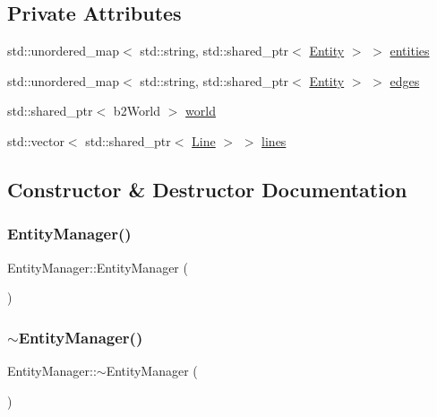 \subsection*{Private Attributes}
\begin{DoxyCompactItemize}
\item 
std\+::unordered\+\_\+map$<$ std\+::string, std\+::shared\+\_\+ptr$<$ \hyperlink{classEntity}{Entity} $>$ $>$ \hyperlink{classEntityManager_a9c442e6363c2269e9c95db90762367f3}{entities}
\item 
std\+::unordered\+\_\+map$<$ std\+::string, std\+::shared\+\_\+ptr$<$ \hyperlink{classEntity}{Entity} $>$ $>$ \hyperlink{classEntityManager_ae93f9beb111b9464327a70173411fda6}{edges}
\item 
std\+::shared\+\_\+ptr$<$ b2\+World $>$ \hyperlink{classEntityManager_ad2fdb512c0f27c7c60fbc9e6d2da4995}{world}
\item 
std\+::vector$<$ std\+::shared\+\_\+ptr$<$ \hyperlink{classLine}{Line} $>$ $>$ \hyperlink{classEntityManager_ae56b17654dc5fbdac4bb2359292cb369}{lines}
\end{DoxyCompactItemize}


\subsection{Constructor \& Destructor Documentation}
\mbox{\label{classEntityManager_a7555637657d090171be6ceee8451de0a}} 
\subsubsection{\texorpdfstring{Entity\+Manager()}{EntityManager()}}
{\footnotesize\ttfamily Entity\+Manager\+::\+Entity\+Manager (\begin{DoxyParamCaption}{ }\end{DoxyParamCaption})}

\mbox{\label{classEntityManager_a71a36c9fb8d579a1a1ec108e0fccf175}} 
\subsubsection{\texorpdfstring{$\sim$\+Entity\+Manager()}{~EntityManager()}}
{\footnotesize\ttfamily Entity\+Manager\+::$\sim$\+Entity\+Manager (\begin{DoxyParamCaption}{ }\end{DoxyParamCaption})}



